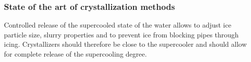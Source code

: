 \subsubsection{State of the art of crystallization methods}
Controlled release of the supercooled state of the water allows to adjust ice particle size, slurry properties and to prevent ice from blocking pipes through icing. Crystallizers should therefore be close to the supercooler and should allow for complete release of the supercooling degree. 




\begin{comment}
Early crystallizing devices used the simple method of seeding or physical disturbances as supercooling release methods \citep{bedecarrats_supercooled_2000}. The used systems however had multiple drawbacks. Seeded methods fail to operate if the temperature of the system rises such that the initial seed crystal completely melts. A new seed crystal then has to be added to the system in order to start the controlled crystallization process again. Also, seed crystals might get flushed away if they are located inside a device in the pipe \citep{kristallisationseinheit_karlsruhe}. The early models using physical disturbances used to be open to the environment \citep{tanino_ice-water_2001}. Open systems suffer from added impurities from the surroundings, which can be a major drawback if foodstuff should be cooled with the slurry. Reproducibility is also lower with this kind of systems. \cite{saito_fundamental_1994} tested various methods like mechanical shock, rubbing of solid surfaced, electrical shocks, vibration, concluding that different kinds of shock may start nucleation with increased tendency for increased collision force. In the early 2000s, more sophisticated approaches used ultrasonic waves to start nucleation. This method allows controlled nucleation in closed pipes, is reported to prevent adhesion of ice in the are of the crystallizer and to allow adjustment of ice crystal size. This method requires some initial energy, but can be turned off as soon as enough present ice crystals can act as seed crystals. Recently, more research is directed to magnetic and electric disturbances to use for controlled nucleation \citep{dalvi-isfahan_review_2017}.
Main requirements for crystallizing devices seem to be the controlled and continuous crystallization, complete release of the supercooling degree of the fluid, prevention of upstream propagation of ice and a closed design to prevent impurities from entering the system. 

\end{comment}



